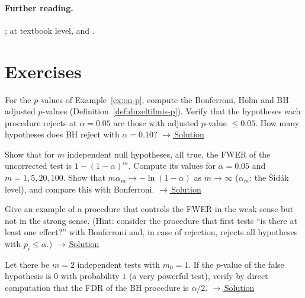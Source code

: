 \documentclass[main.tex]{subfiles}
\begin{document}
\paragraph{Further reading.} \cite{benjamini-hochberg95,holm79,benjamini-yekutieli01}; at textbook level, \cite[Chapter~9]{lehmann-romano} and \cite[Section~10.7]{wasserman}.

\section{Exercises}

\begin{exercise}\label{exr:22-1}
For the $p$-values of Example~\ref{ex:on-p}, compute the Bonferroni, Holm and BH adjusted $p$-values (Definition~\ref{def:duzeltilmis-p}). Verify that the hypotheses each procedure rejects at $\alpha=0.05$ are those with adjusted $p$-value $\le0.05$. How many hypotheses does BH reject with $\alpha=0.10$?
\hfill\hyperref[coz:22-1]{\footnotesize$\rightarrow$\,Solution}
\end{exercise}

\begin{exercise}\label{exr:22-2}
Show that for $m$ independent null hypotheses, all true, the FWER of the uncorrected test is $1-(1-\alpha)^m$. Compute its values for $\alpha=0.05$ and $m=1,5,20,100$. Show that $m\alpha_m\to-\ln(1-\alpha)$ as $m\to\infty$ ($\alpha_m$: the Šidák level), and compare this with Bonferroni.
\hfill\hyperref[coz:22-2]{\footnotesize$\rightarrow$\,Solution}
\end{exercise}

\begin{exercise}\label{exr:22-3}
Give an example of a procedure that controls the FWER in the weak sense but not in the strong sense. (Hint: consider the procedure that first tests ``is there at least one effect?'' with Bonferroni and, in case of rejection, rejects all hypotheses with $p_i\le\alpha$.)
\hfill\hyperref[coz:22-3]{\footnotesize$\rightarrow$\,Solution}
\end{exercise}

\begin{exercise}\label{exr:22-4}
Let there be $m=2$ independent tests with $m_0=1$. If the $p$-value of the false hypothesis is $0$ with probability $1$ (a very powerful test), verify by direct computation that the FDR of the BH procedure is $\alpha/2$.
\hfill\hyperref[coz:22-4]{\footnotesize$\rightarrow$\,Solution}
\end{exercise}

\end{document}
